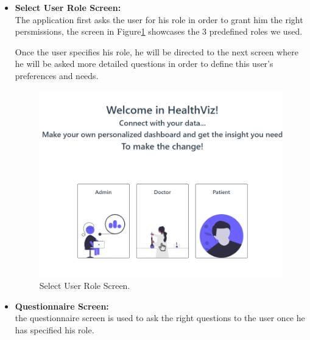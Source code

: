 \begin{itemize}
    \renewcommand{\labelitemi}{$\bullet$}
    \newpage
    \item \textbf{Select User Role Screen:} \\
    The application first asks the user for his role in order to grant him the right persmissions, the screen in Figure\ref{fig:user} showcases the 3 predefined roles we used. 

    Once the user specifies his role, he will be directed to the next screen where he will be asked more detailed questions in order to define this user's preferences and needs.
    \begin{figure}[h!]
      \center
      \includegraphics[width=1\textwidth]{images/chapter4/application/userRole.PNG}
      \caption{Select User Role Screen.}
      \label{fig:user}
  \end{figure}
  \newpage
    \item \textbf{Questionnaire Screen:}\\
     the questionnaire screen is used to ask the right questions to the user once he has specified his role.


\end{itemize}
